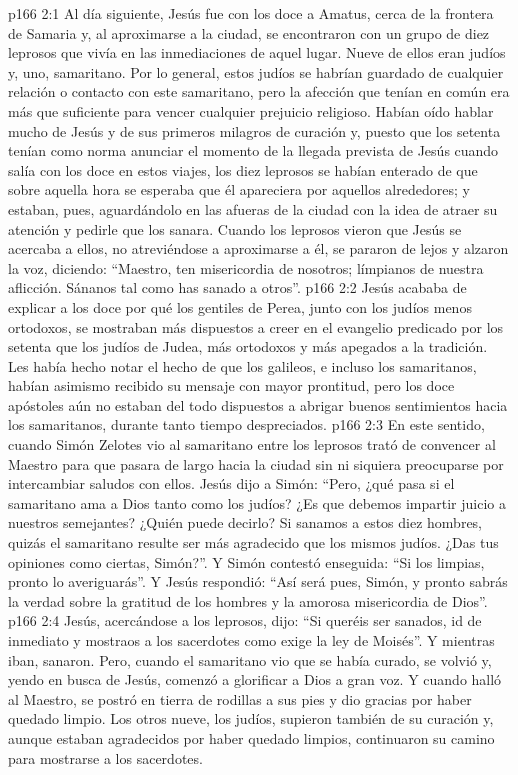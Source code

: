 \vs p166 2:1 Al día siguiente, Jesús fue con los doce a Amatus, cerca de la frontera de Samaria y, al aproximarse a la ciudad, se encontraron con un grupo de diez leprosos que vivía en las inmediaciones de aquel lugar. Nueve de ellos eran judíos y, uno, samaritano. Por lo general, estos judíos se habrían guardado de cualquier relación o contacto con este samaritano, pero la afección que tenían en común era más que suficiente para vencer cualquier prejuicio religioso. Habían oído hablar mucho de Jesús y de sus primeros milagros de curación y, puesto que los setenta tenían como norma anunciar el momento de la llegada prevista de Jesús cuando salía con los doce en estos viajes, los diez leprosos se habían enterado de que sobre aquella hora se esperaba que él apareciera por aquellos alrededores; y estaban, pues, aguardándolo en las afueras de la ciudad con la idea de atraer su atención y pedirle que los sanara. Cuando los leprosos vieron que Jesús se acercaba a ellos, no atreviéndose a aproximarse a él, se pararon de lejos y alzaron la voz, diciendo: “Maestro, ten misericordia de nosotros; límpianos de nuestra aflicción. Sánanos tal como has sanado a otros”.
\vs p166 2:2 Jesús acababa de explicar a los doce por qué los gentiles de Perea, junto con los judíos menos ortodoxos, se mostraban más dispuestos a creer en el evangelio predicado por los setenta que los judíos de Judea, más ortodoxos y más apegados a la tradición. Les había hecho notar el hecho de que los galileos, e incluso los samaritanos, habían asimismo recibido su mensaje con mayor prontitud, pero los doce apóstoles aún no estaban del todo dispuestos a abrigar buenos sentimientos hacia los samaritanos, durante tanto tiempo despreciados.
\vs p166 2:3 En este sentido, cuando Simón Zelotes vio al samaritano entre los leprosos trató de convencer al Maestro para que pasara de largo hacia la ciudad sin ni siquiera preocuparse por intercambiar saludos con ellos. Jesús dijo a Simón: “Pero, ¿qué pasa si el samaritano ama a Dios tanto como los judíos? ¿Es que debemos impartir juicio a nuestros semejantes? ¿Quién puede decirlo? Si sanamos a estos diez hombres, quizás el samaritano resulte ser más agradecido que los mismos judíos. ¿Das tus opiniones como ciertas, Simón?”. Y Simón contestó enseguida: “Si los limpias, pronto lo averiguarás”. Y Jesús respondió: “Así será pues, Simón, y pronto sabrás la verdad sobre la gratitud de los hombres y la amorosa misericordia de Dios”.
\vs p166 2:4 Jesús, acercándose a los leprosos, dijo: “Si queréis ser sanados, id de inmediato y mostraos a los sacerdotes como exige la ley de Moisés”. Y mientras iban, sanaron. Pero, cuando el samaritano vio que se había curado, se volvió y, yendo en busca de Jesús, comenzó a glorificar a Dios a gran voz. Y cuando halló al Maestro, se postró en tierra de rodillas a sus pies y dio gracias por haber quedado limpio. Los otros nueve, los judíos, supieron también de su curación y, aunque estaban agradecidos por haber quedado limpios, continuaron su camino para mostrarse a los sacerdotes.
